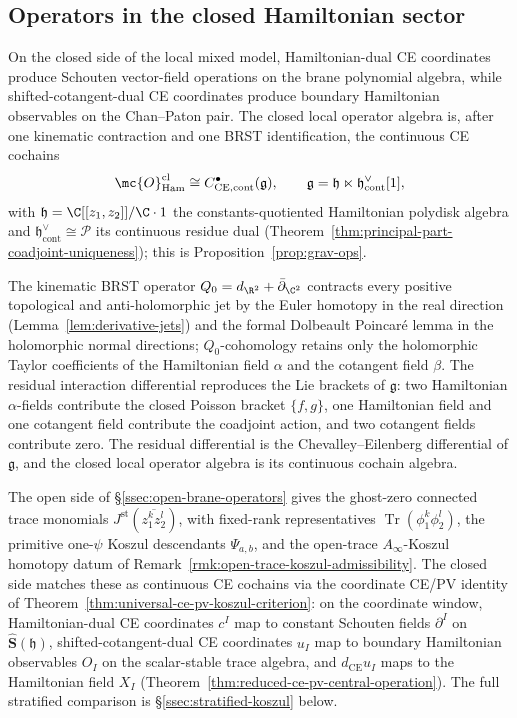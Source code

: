 \documentclass[11pt]{memoir}
\begin{document}


\subsection{Operators in the closed Hamiltonian sector}\label{sec:grav-ops}

On the closed side of the local mixed model, Hamiltonian-dual CE
coordinates produce Schouten vector-field operations on the brane
polynomial algebra, while shifted-cotangent-dual CE coordinates
produce boundary Hamiltonian observables on the Chan--Paton pair.  The
closed local operator algebra is, after one kinematic contraction
and one BRST identification, the continuous CE cochains
\[
  \mc{O}^{\mathrm{cl}}_{\mathrm{Ham}}
   \cong
  C^\bullet_{\mathrm{CE},\mathrm{cont}}(\mathfrak g),
   \qquad
  \mathfrak g
   =\mathfrak h\ltimes\mathfrak h^\vee_{\mathrm{cont}}[1],
\]
with \(\mathfrak h=\C[[z_1,z_2]]/\C\cdot1\) the constants-quotiented
Hamiltonian polydisk algebra and \(\mathfrak h^\vee_{\mathrm{cont}}\cong
\mathcal P\) its continuous residue dual
(Theorem~\ref{thm:principal-part-coadjoint-uniqueness}); this is
Proposition~\ref{prop:grav-ops}.

The kinematic BRST operator \(Q_0=d_{\R^2}+\bar\partial_{\C^2}\)
contracts every positive topological and anti-holomorphic jet by the
Euler homotopy in the real direction
(Lemma~\ref{lem:derivative-jets}) and the formal Dolbeault Poincar\'e
lemma in the holomorphic normal directions; \(Q_0\)-cohomology
retains only the holomorphic Taylor coefficients of the Hamiltonian
field \(\alpha\) and the cotangent field \(\beta\).  The residual
interaction differential reproduces the Lie brackets of
\(\mathfrak g\): two Hamiltonian \(\alpha\)-fields contribute the
closed Poisson bracket \(\{f,g\}\), one Hamiltonian field and one
cotangent field contribute the coadjoint action, and two cotangent
fields contribute zero.  The residual differential is the
Chevalley--Eilenberg differential of \(\mathfrak g\), and the closed
local operator algebra is its continuous cochain algebra.

The open side of \S\ref{ssec:open-brane-operators} gives the
ghost-zero connected trace monomials
\(J^{\mathrm{st}}(\overline{z_1^kz_2^l})\), with fixed-rank
representatives \(\operatorname{Tr}(\phi_1^k\phi_2^l)\), the primitive
one-\(\psi\) Koszul descendants \(\Psi_{a,b}\), and the open-trace
\(A_\infty\)-Koszul homotopy datum of
Remark~\ref{rmk:open-trace-koszul-admissibility}.  The closed side
matches these as continuous CE cochains via the coordinate CE/PV
identity of Theorem~\ref{thm:universal-ce-pv-koszul-criterion}: on
the coordinate window, Hamiltonian-dual CE coordinates \(c^I\) map
to constant Schouten fields \(\partial^I\) on
\(\widehat{\mathbf S}(\mathfrak h)\), shifted-cotangent-dual CE
coordinates \(u_I\) map to boundary Hamiltonian observables \(O_I\)
on the scalar-stable trace algebra, and
\(d_{\mathrm{CE}}u_I\) maps to the Hamiltonian field \(X_I\)
(Theorem~\ref{thm:reduced-ce-pv-central-operation}).  The full
stratified comparison is \S\ref{ssec:stratified-koszul} below.
\end{document}
